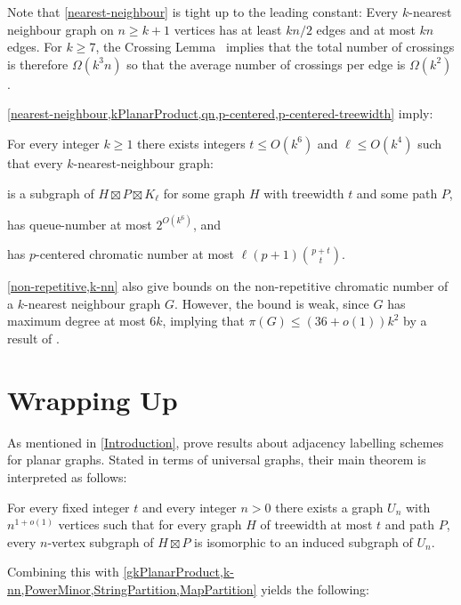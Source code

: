 \documentclass{patmorin}
\renewcommand{\ge}{\geqslant}
\renewcommand{\geq}{\geqslant}
\renewcommand{\leq}{\leqslant}
\begin{document}
Note that \cref{nearest-neighbour} is tight up to the leading constant:  Every $k$-nearest neighbour graph on $n\ge k+1$ vertices has at least $kn/2$ edges and at most $kn$ edges.  For $k\ge 7$, the Crossing Lemma~\citep{ajtai.chvatal.ea:crossing-free,leighton:complexity} implies that the total number of crossings is therefore $\Omega(k^3n)$ so that the average number of crossings per edge is $\Omega(k^2)$.

\cref{nearest-neighbour,kPlanarProduct,qn,p-centered,p-centered-treewidth} imply:

\begin{cor}
\label{k-nn}
For every integer $k\geq 1$ there exists integers $t\leq O(k^6)$ and $\ell\leq O(k^4)$ such that every $k$-nearest-neighbour graph:
\begin{compactitem}
\item is a subgraph of $H\boxtimes P \boxtimes K_\ell$ for some graph $H$ with treewidth $t$ and some path $P$, 
\item has queue-number at most $2^{O(k^6)}$, and
\item has $p$-centered chromatic number at most $\ell (p+1)\binom{p+t}{t}$.
\end{compactitem}
\end{cor}

\cref{non-repetitive,k-nn} also give bounds on the non-repetitive chromatic number of a $k$-nearest neighbour graph $G$. However, the bound is weak, since $G$ has maximum degree at most $6k$, implying that $\pi(G) \leq (36+o(1))k^2$ by a result of \citet{DJKW16}.

\section{Wrapping Up}


As mentioned in \cref{Introduction}, \citet{DEJGMM21} prove results about adjacency labelling schemes for planar graphs. Stated in terms of universal graphs, their main theorem is interpreted as follows:

\begin{thm}
	\label{Universal}
	For every fixed integer $t$ and every integer $n>0$ there exists a
	graph $U_n$ with $n^{1+o(1)}$ vertices such that for every graph $H$ of
	treewidth at most $t$ and path $P$, every $n$-vertex subgraph of $H\boxtimes P$ is isomorphic to an induced subgraph of $U_n$.
\end{thm}

Combining this with \cref{gkPlanarProduct,k-nn,PowerMinor,StringPartition,MapPartition} yields the following:
\end{document}
